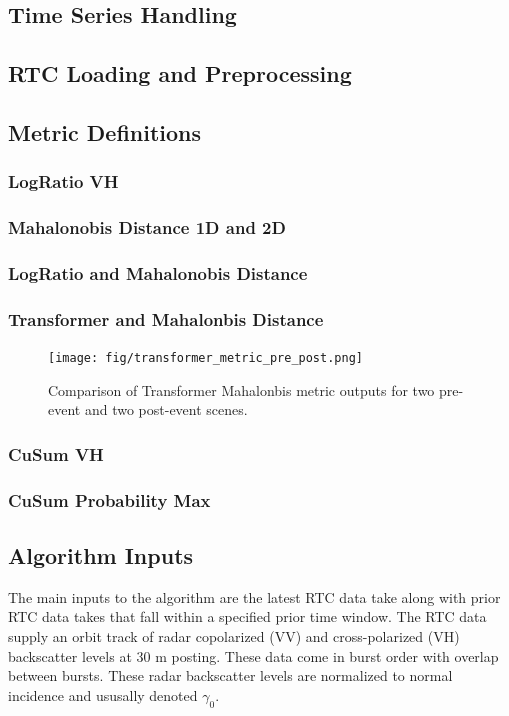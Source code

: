 \documentclass[11pt]{article}
\begin{document}
\subsection{Time Series Handling}

\subsection{RTC Loading and Preprocessing}

\subsection{Metric Definitions}

\subsubsection{LogRatio VH}
\subsubsection{Mahalonobis Distance 1D and 2D}
\subsubsection{LogRatio and Mahalonobis Distance}
\subsubsection{Transformer and Mahalonbis Distance}

\begin{figure}[!t]
\centering
\texttt{[image: fig/transformer\_metric\_pre\_post.png]}
\caption{Comparison of Transformer Mahalonbis metric outputs for two
pre-event and two post-event scenes.}
\label{fig_transformer_metric_pre_post}
\end{figure}

\subsubsection{CuSum VH}
\subsubsection{CuSum Probability Max}

\subsection{Algorithm Inputs}

The main inputs to the algorithm are the latest RTC data take
along with prior RTC data takes that fall within a specified
prior time window.
The RTC data supply an orbit track of radar copolarized (VV)
and cross-polarized (VH) backscatter levels at 30 m posting.
These data come in burst order with overlap between bursts.
These radar backscatter levels are normalized to normal incidence
and ususally denoted $\gamma_0$.
\end{document}
